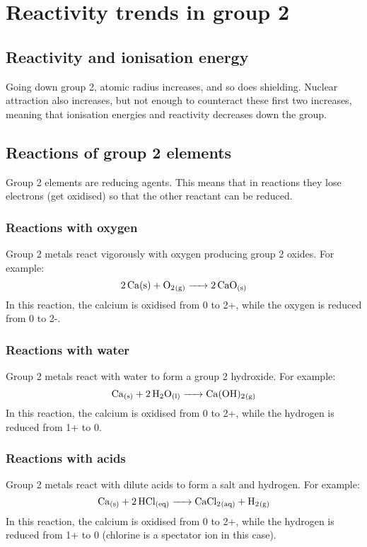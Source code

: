 \section{Reactivity trends in group 2}
\subsection{Reactivity and ionisation energy}
Going down group 2, atomic radius increases, and so does shielding. Nuclear attraction also increases, but not enough to counteract these first two increases, meaning that ionisation energies and reactivity decreases down the group.

\subsection{Reactions of group 2 elements}
Group 2 elements are reducing agents. This means that in reactions they lose electrons (get oxidised) so that the other reactant can be reduced.

\subsubsection{Reactions with oxygen}
Group 2 metals react vigorously with oxygen producing group 2 oxides. For example:
\begin{equation}
	\ce{2Ca{(s)} + O2_{(g)} -> 2CaO_{(s)}}
\end{equation}
In this reaction, the calcium is oxidised from 0 to 2+, while the oxygen is reduced from 0 to 2-.

\subsubsection{Reactions with water}
Group 2 metals react with water to form a group 2 hydroxide. For example:
\begin{equation}
	\ce{Ca_{(s)} + 2H2O_{(l)} -> Ca(OH)2_{(g)}}
\end{equation}
In this reaction, the calcium is oxidised from 0 to 2+, while the hydrogen is reduced from 1+ to 0.

\subsubsection{Reactions with acids}
Group 2 metals react with dilute acids to form a salt and hydrogen. For example:
\begin{equation}
	\ce{Ca_{(s)} + 2HCl_{(eq)} -> CaCl2_{(aq)} + H2_{(g)}}
\end{equation}
In this reaction, the calcium is oxidised from 0 to 2+, while the hydrogen is reduced from 1+ to 0 (chlorine is a spectator ion in this case).

